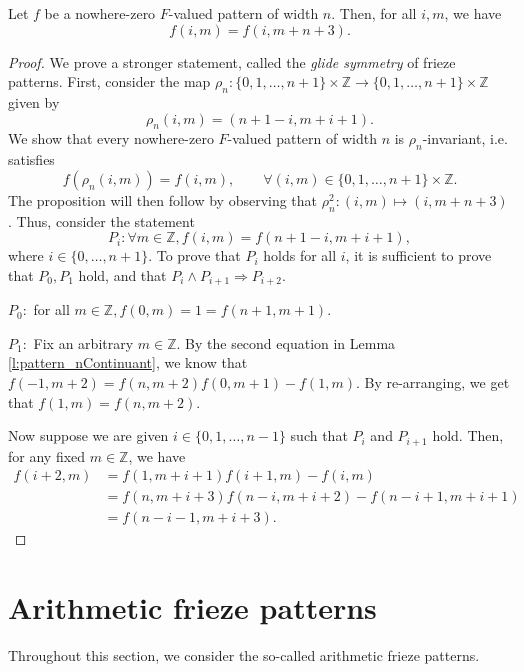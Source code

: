 \begin{proposition}
    \label{prop:trslt-inv}
    Let $f$ be a nowhere-zero $F$-valued pattern of width $n$. Then, for all $i,m$, we have
    \[
        f(i,m) = f(i,m+n+3).
    \]
\end{proposition}
\begin{proof}
    We prove a stronger statement, called the \textit{glide symmetry} of frieze patterns. First, consider 
    the map $\rho_n: \{0,1,\ldots , n+1\} \times \mathbb{Z} \longrightarrow \{0,1,\ldots , n+1\} \times \mathbb{Z}$ given by
    \begin{equation}  
    \label{def:glide}
        \rho_n(i,m) = (n+1-i, m+i+1).
    \end{equation}
    We show that every nowhere-zero $F$-valued pattern of width $n$ is $\rho_n$-invariant, i.e. satisfies 
    \[
        f(\rho_n(i,m)) = f(i,m), \qquad \forall (i,m) \in \{0,1,\ldots , n+1\} \times \mathbb{Z}.
    \]
    The proposition will then follow by observing that $\rho_n^2 : (i,m) \mapsto (i,m+n+3)$. Thus, consider the statement
    \[
        P_i: \forall m \in \mathbb{Z}, f (i,m) = f (n+1-i,m+i+1),
    \]
    where $i \in \{0, \ldots, n+1\}$. To prove that $P_i$ holds for all $i$, it is sufficient to prove that $P_0, P_1$ hold, 
    and that $P_i \wedge P_{i+1} \Rightarrow P_{i+2}$. 

    $P_0:$ for all $m \in \mathbb{Z}, f(0,m) = 1 = f(n+1,m+1)$. 

    $P_1:$ Fix an arbitrary $m \in \mathbb{Z}$. By the second equation in Lemma \ref{l:pattern_nContinuant}, we know that 
    $f (-1,m+2) = f (n,m+2) f (0,m+1) - f (1,m)$. By re-arranging, we get that $f (1,m) = f (n,m+2)$. 

    Now suppose we are given $i \in \{0,1,\ldots , n-1\}$ such that $P_i$ and $P_{i+1}$ hold. Then, for any fixed $m \in \mathbb{Z}$, 
    we have 
    \begin{align*}
        f (i+2,m) &= f (1,m+i+1)f (i+1,m) - f (i,m) \\
                    &= f (n,m+i+3) f (n-i,m+i+2) - f (n- i+1, m + i + 1) \\
                    &= f (n-i-1,m + i + 3).
    \end{align*}
\end{proof}



\section{Arithmetic frieze patterns}
Throughout this section, we consider the so-called arithmetic frieze patterns.

